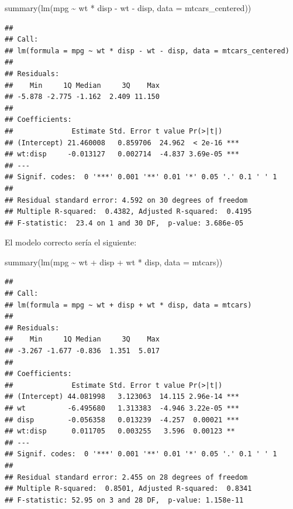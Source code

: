 \documentclass[
  12pt,
]{book}
\newenvironment{Shaded}{\begin{snugshade}}{\end{snugshade}}
\newcommand{\AttributeTok}[1]{\textcolor[rgb]{0.77,0.63,0.00}{#1}}
\newcommand{\FunctionTok}[1]{\textcolor[rgb]{0.00,0.00,0.00}{#1}}
\newcommand{\NormalTok}[1]{#1}
\newcommand{\SpecialCharTok}[1]{\textcolor[rgb]{0.00,0.00,0.00}{#1}}
\begin{document}
\begin{Shaded}
\begin{Highlighting}[]
\FunctionTok{summary}\NormalTok{(}\FunctionTok{lm}\NormalTok{(mpg }\SpecialCharTok{\textasciitilde{}}\NormalTok{ wt }\SpecialCharTok{*}\NormalTok{ disp }\SpecialCharTok{{-}}\NormalTok{ wt }\SpecialCharTok{{-}}\NormalTok{ disp, }\AttributeTok{data =}\NormalTok{ mtcars\_centered))}
\end{Highlighting}
\end{Shaded}

\begin{verbatim}
## 
## Call:
## lm(formula = mpg ~ wt * disp - wt - disp, data = mtcars_centered)
## 
## Residuals:
##    Min     1Q Median     3Q    Max 
## -5.878 -2.775 -1.162  2.409 11.150 
## 
## Coefficients:
##              Estimate Std. Error t value Pr(>|t|)    
## (Intercept) 21.460008   0.859706  24.962  < 2e-16 ***
## wt:disp     -0.013127   0.002714  -4.837 3.69e-05 ***
## ---
## Signif. codes:  0 '***' 0.001 '**' 0.01 '*' 0.05 '.' 0.1 ' ' 1
## 
## Residual standard error: 4.592 on 30 degrees of freedom
## Multiple R-squared:  0.4382, Adjusted R-squared:  0.4195 
## F-statistic:  23.4 on 1 and 30 DF,  p-value: 3.686e-05
\end{verbatim}

El modelo correcto sería el siguiente:

\begin{Shaded}
\begin{Highlighting}[]
\FunctionTok{summary}\NormalTok{(}\FunctionTok{lm}\NormalTok{(mpg }\SpecialCharTok{\textasciitilde{}}\NormalTok{ wt }\SpecialCharTok{+}\NormalTok{ disp }\SpecialCharTok{+}\NormalTok{ wt }\SpecialCharTok{*}\NormalTok{ disp, }\AttributeTok{data =}\NormalTok{ mtcars))}
\end{Highlighting}
\end{Shaded}

\begin{verbatim}
## 
## Call:
## lm(formula = mpg ~ wt + disp + wt * disp, data = mtcars)
## 
## Residuals:
##    Min     1Q Median     3Q    Max 
## -3.267 -1.677 -0.836  1.351  5.017 
## 
## Coefficients:
##              Estimate Std. Error t value Pr(>|t|)    
## (Intercept) 44.081998   3.123063  14.115 2.96e-14 ***
## wt          -6.495680   1.313383  -4.946 3.22e-05 ***
## disp        -0.056358   0.013239  -4.257  0.00021 ***
## wt:disp      0.011705   0.003255   3.596  0.00123 ** 
## ---
## Signif. codes:  0 '***' 0.001 '**' 0.01 '*' 0.05 '.' 0.1 ' ' 1
## 
## Residual standard error: 2.455 on 28 degrees of freedom
## Multiple R-squared:  0.8501, Adjusted R-squared:  0.8341 
## F-statistic: 52.95 on 3 and 28 DF,  p-value: 1.158e-11
\end{verbatim}
\end{document}
